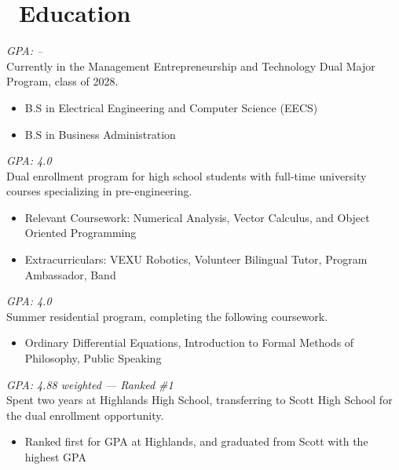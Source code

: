 \documentclass{resume}
\begin{document}
\vspace*{-0.4in} %
\section{\faGraduationCap\ Education}
\textit{GPA: --}\\
Currently in the Management Entrepreneurship and Technology Dual Major Program, class of 2028.
\begin{itemize}
    \item B.S in Electrical Engineering and Computer Science (EECS)
    \item B.S in Business Administration
\end{itemize}
\textit{GPA: 4.0}\\
Dual enrollment program for high school students with full-time university courses specializing in pre-engineering.
\begin{itemize}
    \item Relevant Coursework: Numerical Analysis, Vector Calculus, and Object Oriented Programming
    \item Extracurriculars: VEXU Robotics, Volunteer Bilingual Tutor, Program Ambassador, Band
\end{itemize}
\datedsubsection{\textbf{Stanford}, CA}{Summer 2023}
\textit{GPA: 4.0}\\
Summer residential program, completing the following coursework.
\begin{itemize}
    \item Ordinary Differential Equations, Introduction to Formal Methods of Philosophy, Public Speaking
\end{itemize}
\textit{GPA: 4.88 weighted --- Ranked \#1}\\
Spent two years at Highlands High School, transferring to Scott High School for the dual enrollment opportunity.

\begin{itemize}
     \item Ranked first for GPA at Highlands, and graduated from Scott with the highest GPA
\end{itemize}
\end{document}
